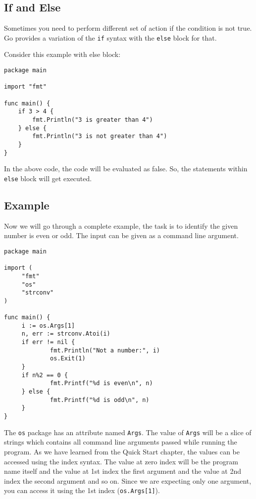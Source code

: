 \subsection{If and Else}

Sometimes you need to perform different set of action if the condition
is not true.  Go provides a variation of the \texttt{if} syntax with
the \texttt{else} block for that.

Consider this example with else block:

\begin{lstlisting}[caption=If with else block]
package main

import "fmt"

func main() {
    if 3 > 4 {
        fmt.Println("3 is greater than 4")
    } else {
        fmt.Println("3 is not greater than 4")
    }
}
\end{lstlisting}

In the above code, the code will be evaluated as false.  So, the
statements within \texttt{else} block will get executed.

\subsection{Example}

Now we will go through a complete example, the task is to identify the
given number is even or odd.  The input can be given as a command line
argument.

\begin{lstlisting}[caption=If with else example]
package main

import (
     "fmt"
     "os"
     "strconv"
)

func main() {
     i := os.Args[1]
     n, err := strconv.Atoi(i)
     if err != nil {
             fmt.Println("Not a number:", i)
             os.Exit(1)
     }
     if n%2 == 0 {
             fmt.Printf("%d is even\n", n)
     } else {
             fmt.Printf("%d is odd\n", n)
     }
}
\end{lstlisting}

The \texttt{os} package has an attribute named \texttt{Args}. The value
of \texttt{Args} will be a slice of strings which contains all command line
arguments passed while running the program. As we have learned from the Quick
Start chapter, the values can be accessed using the index syntax. The value at
zero index will be the program name itself and the value at 1st index the first
argument and the value at 2nd index the second argument and so on. Since we are
expecting only one argument, you can access it using the 1st index
(\texttt{os.Args[1]}).

